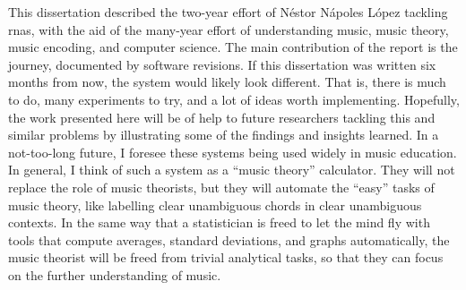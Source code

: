 
This dissertation described the two-year effort of N\'estor
N\'apoles L\'opez tackling \glspl{rna}, with the aid of the
many-year effort of understanding music, music theory, music
encoding, and computer science. The main contribution of the
report is the journey, documented by software revisions. If
this dissertation was written six months from now, the
system would likely look different. That is, there is much
to do, many experiments to try, and a lot of ideas worth
implementing. Hopefully, the work presented here will be of
help to future researchers tackling this and similar
problems by illustrating some of the findings and insights
learned. In a not-too-long future, I foresee these systems
being used widely in music education. In general, I think of
such a system as a ``music theory'' calculator. They will
not replace the role of music theorists, but they will
automate the ``easy'' tasks of music theory, like labelling
clear unambiguous chords in clear unambiguous contexts. In the same way that a statistician is freed to let the mind fly with tools that compute averages, standard deviations, and graphs automatically, the music theorist will be freed from trivial analytical tasks, so that they can focus on the further understanding of music. 
